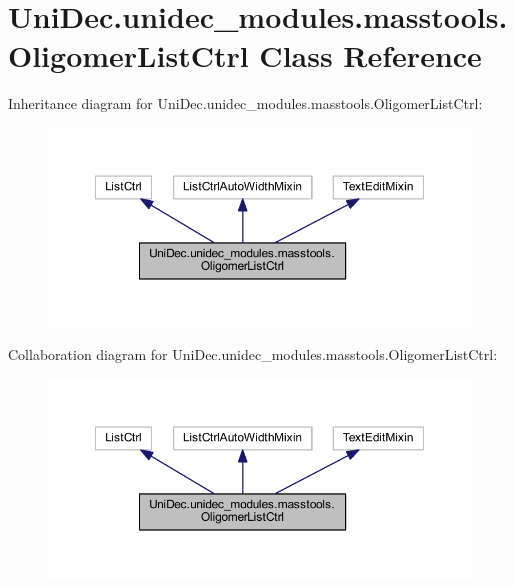 \hypertarget{class_uni_dec_1_1unidec__modules_1_1masstools_1_1_oligomer_list_ctrl}{}\section{Uni\+Dec.\+unidec\+\_\+modules.\+masstools.\+Oligomer\+List\+Ctrl Class Reference}
\label{class_uni_dec_1_1unidec__modules_1_1masstools_1_1_oligomer_list_ctrl}


Inheritance diagram for Uni\+Dec.\+unidec\+\_\+modules.\+masstools.\+Oligomer\+List\+Ctrl\+:\nopagebreak
\begin{figure}[H]
\begin{center}
\leavevmode
\includegraphics[width=350pt]{class_uni_dec_1_1unidec__modules_1_1masstools_1_1_oligomer_list_ctrl__inherit__graph}
\end{center}
\end{figure}


Collaboration diagram for Uni\+Dec.\+unidec\+\_\+modules.\+masstools.\+Oligomer\+List\+Ctrl\+:\nopagebreak
\begin{figure}[H]
\begin{center}
\leavevmode
\includegraphics[width=350pt]{class_uni_dec_1_1unidec__modules_1_1masstools_1_1_oligomer_list_ctrl__coll__graph}
\end{center}
\end{figure}
